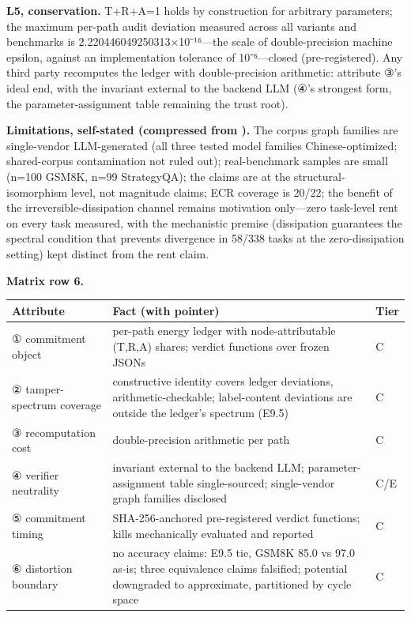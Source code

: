 \documentclass[11pt,a4paper]{article}
\begin{document}
\textbf{L5, conservation.} T+R+A=1 holds by construction for arbitrary parameters; the maximum per-path audit deviation measured across all variants and benchmarks is 2.220446049250313×10⁻¹⁶—the scale of double-precision machine epsilon, against an implementation tolerance of 10⁻⁶—closed (pre-registered). Any third party recomputes the ledger with double-precision arithmetic: attribute ③'s ideal end, with the invariant external to the backend LLM (④'s strongest form, the parameter-assignment table remaining the trust root).

\textbf{Limitations, self-stated (compressed from \cite{key04}).} The corpus graph families are single-vendor LLM-generated (all three tested model families Chinese-optimized; shared-corpus contamination not ruled out); real-benchmark samples are small (n=100 GSM8K, n=99 StrategyQA); the claims are at the structural-isomorphism level, not magnitude claims; ECR coverage is 20/22; the benefit of the irreversible-dissipation channel remains motivation only—zero task-level rent on every task measured, with the mechanistic premise (dissipation guarantees the spectral condition that prevents divergence in 58/338 tasks at the zero-dissipation setting) kept distinct from the rent claim.

\noindent\textbf{Matrix row 6.}

\begin{table}[htbp]
\centering
\footnotesize
\setlength{\tabcolsep}{3.5pt}
\renewcommand{\arraystretch}{1.18}
\begin{tabularx}{0.985\textwidth}{>{\raggedright\arraybackslash}p{} >{\raggedright\arraybackslash}X >{\raggedright\arraybackslash}p{}}
\toprule
\textbf{Attribute} & \textbf{Fact (with pointer)} & \textbf{Tier} \\
\midrule
① commitment object & per-path energy ledger with node-attributable (T,R,A) shares; verdict functions over frozen JSONs \cite{key04} & C \\
② tamper-spectrum coverage & constructive identity covers ledger deviations, arithmetic-checkable; label-content deviations are outside the ledger's spectrum (E9.5) \cite{key04} & C \\
③ recomputation cost & double-precision arithmetic per path \cite{key04} & C \\
④ verifier neutrality & invariant external to the backend LLM; parameter-assignment table single-sourced; single-vendor graph families disclosed \cite{key04} & C\slash E \\
⑤ commitment timing & SHA-256-anchored pre-registered verdict functions; kills mechanically evaluated and reported \cite{key04} & C \\
⑥ distortion boundary & no accuracy claims: E9.5 tie, GSM8K 85.0 vs 97.0 as-is; three equivalence claims falsified; potential downgraded to approximate, partitioned by cycle space \cite{key04} & C \\
\bottomrule
\end{tabularx}
\end{table}
\end{document}
